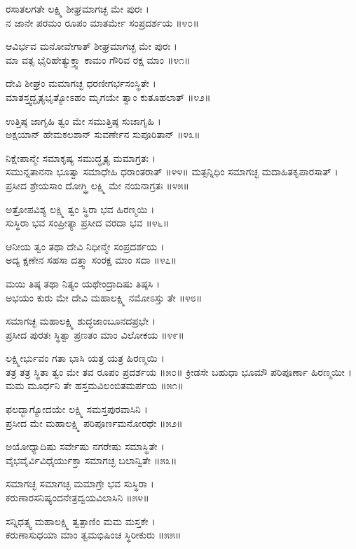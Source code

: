 	ರಸಾತಲಗತೇ ಲಕ್ಷ್ಮಿ ಶೀಘ್ರಮಾಗಚ್ಛ ಮೇ ಪುರಃ ।\\
	ನ ಜಾನೇ ಪರಮಂ ರೂಪಂ ಮಾತರ್ಮೇ ಸಂಪ್ರದರ್ಶಯ ॥೪೦॥

ಆವಿರ್ಭವ ಮನೋವೇಗಾತ್ ಶೀಘ್ರಮಾಗಚ್ಛ ಮೇ ಪುರಃ ।\\
ಮಾ ವತ್ಸ ಭೈರಿಹೇತ್ಯುಕ್ತ್ವಾ ಕಾಮಂ ಗೌರಿವ ರಕ್ಷ ಮಾಂ ॥೪೧॥

	ದೇವಿ ಶೀಘ್ರಂ ಮಮಾಗಚ್ಛ ಧರಣೀಗರ್ಭಸಂಸ್ಥಿತೇ ।\\
	ಮಾತಸ್ತ್ವದ್ಭೃತ್ಯಭೃತ್ಯೋಽಹಂ ಮೃಗಯೇ ತ್ವಾಂ ಕುತೂಹಲಾತ್ ॥೪೨॥

ಉತ್ತಿಷ್ಠ ಜಾಗೃಹಿ ತ್ವಂ ಮೇ ಸಮುತ್ತಿಷ್ಠ ಸುಜಾಗೃಹಿ ।\\
ಅಕ್ಷಯಾನ್ ಹೇಮಕಲಶಾನ್ ಸುವರ್ಣೇನ ಸುಪೂರಿತಾನ್ ॥೪೩॥

	ನಿಕ್ಷೇಪಾನ್ಮೇ ಸಮಾಕೃಷ್ಯ ಸಮುದ್ಧೃತ್ಯ ಮಮಾಗ್ರತಃ ।\\
	ಸಮುನ್ನತಾನನಾ ಭೂತ್ವಾ ಸಮಾಧೇಹಿ ಧರಾಂತರಾತ್ ॥೪೪॥
\newpage
ಮತ್ಸನ್ನಿಧಿಂ ಸಮಾಗಚ್ಛ ಮದಾಹಿತಕೃಪಾರಸಾತ್ ।\\
ಪ್ರಸೀದ ಶ್ರೇಯಸಾಂ ದೋಗ್ಧ್ರಿ ಲಕ್ಷ್ಮಿ ಮೇ ನಯನಾಗ್ರತಃ ॥೪೫॥

	ಅತ್ರೋಪವಿಶ್ಯ ಲಕ್ಷ್ಮಿ ತ್ವಂ ಸ್ಥಿರಾ ಭವ ಹಿರಣ್ಮಯಿ ।\\
	ಸುಸ್ಥಿರಾ ಭವ ಸಂಪ್ರೀತ್ಯಾ ಪ್ರಸೀದ ವರದಾ ಭವ ॥೪೬॥

ಆನೀಯ ತ್ವಂ ತಥಾ ದೇವಿ ನಿಧೀನ್ಮೇ ಸಂಪ್ರದರ್ಶಯ ।\\
ಅದ್ಯ ಕ್ಷಣೇನ ಸಹಸಾ ದತ್ತ್ವಾ ಸಂರಕ್ಷ ಮಾಂ ಸದಾ ॥೪೭॥

	ಮಯಿ ತಿಷ್ಠ ತಥಾ ನಿತ್ಯಂ ಯಥೇಂದ್ರಾದಿಷು ತಿಷ್ಠಸಿ ।\\
	ಅಭಯಂ ಕುರು ಮೇ ದೇವಿ ಮಹಾಲಕ್ಷ್ಮಿ ನಮೋಽಸ್ತು ತೇ ॥೪೮॥

ಸಮಾಗಚ್ಛ ಮಹಾಲಕ್ಷ್ಮಿ ಶುದ್ಧಜಾಂಬೂನದಪ್ರಭೇ ।\\
ಪ್ರಸೀದ ಪುರತಃ ಸ್ಥಿತ್ವಾ ಪ್ರಣತಂ ಮಾಂ ವಿಲೋಕಯ ॥೪೯॥

	ಲಕ್ಷ್ಮೀರ್ಭುವಂ ಗತಾ ಭಾಸಿ ಯತ್ರ ಯತ್ರ ಹಿರಣ್ಮಯಿ ।\\
	ತತ್ರ ತತ್ರ ಸ್ಥಿತಾ ತ್ವಂ ಮೇ ತವ ರೂಪಂ ಪ್ರದರ್ಶಯ ॥೫೦॥
\newpage
ಕ್ರೀಡಸೇ ಬಹುಧಾ ಭೂಮೌ ಪರಿಪೂರ್ಣಾ ಹಿರಣ್ಮಯೀ ।\\
ಮಮ ಮೂರ್ಧನಿ ತೇ ಹಸ್ತಮವಿಲಂಬಿತಮರ್ಪಯ ॥೫೧॥

ಫಲದ್ಭಾಗ್ಯೋದಯೇ ಲಕ್ಷ್ಮಿ ಸಮಸ್ತಪುರವಾಸಿನಿ ।\\
ಪ್ರಸೀದ ಮೇ ಮಹಾಲಕ್ಷ್ಮಿ ಪರಿಪೂರ್ಣಮನೋರಥೇ ॥೫೨॥

	ಅಯೋಧ್ಯಾದಿಷು ಸರ್ವೇಷು ನಗರೇಷು ಸಮಾಸ್ಥಿತೇ ।\\
	ವೈಭವೈರ್ವಿವಿಧೈರ್ಯುಕ್ತಾ ಸಮಾಗಚ್ಛ ಬಲಾನ್ವಿತೇ ॥೫೩॥

ಸಮಾಗಚ್ಛ ಸಮಾಗಚ್ಛ ಮಮಾಗ್ರೇ ಭವ ಸುಸ್ಥಿರಾ ।\\
ಕರುಣಾರಸನಿಷ್ಯಂದನೇತ್ರದ್ವಯವಿಲಾಸಿನಿ ॥೫೪॥

	ಸನ್ನಿಧತ್ಸ್ವ ಮಹಾಲಕ್ಷ್ಮಿ ತ್ವತ್ಪಾಣಿಂ ಮಮ ಮಸ್ತಕೇ ।\\
	ಕರುಣಾಸುಧಯಾ ಮಾಂ ತ್ವಮಭಿಷಿಂಚ ಸ್ಥಿರೀಕುರು ॥೫೫॥

